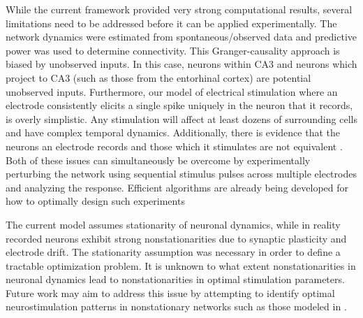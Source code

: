 \documentclass[11pt,a4paper,final]{article}
\begin{document}
While the current framework provided very strong computational results, several limitations need to be addressed before it can be applied experimentally.
The network dynamics were estimated from spontaneous/observed data and predictive power was used to determine connectivity.
This Granger-causality approach is biased by unobserved inputs.
In this case, neurons within CA3 and neurons which project to CA3 (such as those from the entorhinal cortex) are potential unobserved inputs.
Furthermore, our model of electrical stimulation where an electrode consistently elicits a single spike uniquely in the neuron that it records, is overly simplistic.
Any stimulation will affect at least dozens of surrounding cells \citep{grill05,desai14} and have complex temporal dynamics.
Additionally, there is evidence that the neurons an electrode records and those which it stimulates are not equivalent \citep{histed2009direct}.
Both of these issues can simultaneously be overcome by experimentally perturbing the network using sequential stimulus pulses across multiple electrodes and analyzing the response.
Efficient algorithms are already being developed for how to optimally design such experiments \citep{lepage13,kim14}

The current model assumes stationarity of neuronal dynamics, while in reality recorded neurons exhibit strong nonstationarities due to synaptic plasticity and electrode drift.
The stationarity assumption was necessary in order to define a tractable optimization problem.
It is unknown to what extent nonstationarities in neuronal dynamics lead to nonstationarities in optimal stimulation parameters.
Future work may aim to address this issue by attempting to identify optimal neurostimulation patterns in nonstationary networks such as those modeled in \citet{robinson16}.
\end{document}
